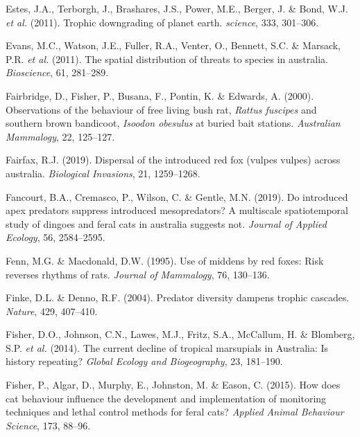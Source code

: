 \documentclass[11pt,a4paper,titlepage,twoside,openright]{style/unimelbthesis}
\begin{document}
\begin{mainmatter}
\leavevmode\hypertarget{ref-estes2011trophic}{}%
Estes, J.A., Terborgh, J., Brashares, J.S., Power, M.E., Berger, J. \& Bond, W.J. \emph{et al.} (2011). Trophic downgrading of planet earth. \emph{science}, 333, 301--306.

\leavevmode\hypertarget{ref-evans2011spatial}{}%
Evans, M.C., Watson, J.E., Fuller, R.A., Venter, O., Bennett, S.C. \& Marsack, P.R. \emph{et al.} (2011). The spatial distribution of threats to species in australia. \emph{Bioscience}, 61, 281--289.

\leavevmode\hypertarget{ref-fairbridge2000observations}{}%
Fairbridge, D., Fisher, P., Busana, F., Pontin, K. \& Edwards, A. (2000). Observations of the behaviour of free living bush rat, \emph{Rattus fuscipes} and southern brown bandicoot, \emph{Isoodon obesulus} at buried bait stations. \emph{Australian Mammalogy}, 22, 125--127.

\leavevmode\hypertarget{ref-fairfax2019dispersal}{}%
Fairfax, R.J. (2019). Dispersal of the introduced red fox (vulpes vulpes) across australia. \emph{Biological Invasions}, 21, 1259--1268.

\leavevmode\hypertarget{ref-fancourt2019introduced}{}%
Fancourt, B.A., Cremasco, P., Wilson, C. \& Gentle, M.N. (2019). Do introduced apex predators suppress introduced mesopredators? A multiscale spatiotemporal study of dingoes and feral cats in australia suggests not. \emph{Journal of Applied Ecology}, 56, 2584--2595.

\leavevmode\hypertarget{ref-fenn1995use}{}%
Fenn, M.G. \& Macdonald, D.W. (1995). Use of middens by red foxes: Risk reverses rhythms of rats. \emph{Journal of Mammalogy}, 76, 130--136.

\leavevmode\hypertarget{ref-finke2004predator}{}%
Finke, D.L. \& Denno, R.F. (2004). Predator diversity dampens trophic cascades. \emph{Nature}, 429, 407--410.

\leavevmode\hypertarget{ref-fisher2014current}{}%
Fisher, D.O., Johnson, C.N., Lawes, M.J., Fritz, S.A., McCallum, H. \& Blomberg, S.P. \emph{et al.} (2014). The current decline of tropical marsupials in Australia: Is history repeating? \emph{Global Ecology and Biogeography}, 23, 181--190.

\leavevmode\hypertarget{ref-fisher2015cat}{}%
Fisher, P., Algar, D., Murphy, E., Johnston, M. \& Eason, C. (2015). How does cat behaviour influence the development and implementation of monitoring techniques and lethal control methods for feral cats? \emph{Applied Animal Behaviour Science}, 173, 88--96.


\end{mainmatter}
\end{document}
